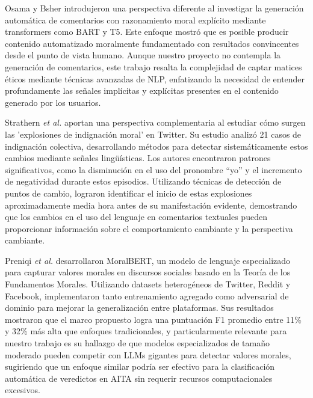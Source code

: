 Osama y Bsher \cite{osama2023} introdujeron una perspectiva diferente al investigar la generación automática de comentarios con razonamiento moral explícito mediante transformers como BART y T5. Este enfoque mostró que es posible producir contenido automatizado moralmente fundamentado con resultados convincentes desde el punto de vista humano. Aunque nuestro proyecto no contempla la generación de comentarios, este trabajo resalta la complejidad de captar matices éticos mediante técnicas avanzadas de NLP, enfatizando la necesidad de entender profundamente las señales implícitas y explícitas presentes en el contenido generado por los usuarios.

Strathern \textit{et al.} \cite{strathern2020} aportan una perspectiva complementaria al estudiar cómo surgen las 'explosiones de indignación moral' en Twitter. Su estudio analizó 21 casos de indignación colectiva, desarrollando métodos para detectar sistemáticamente estos cambios mediante señales lingüísticas. Los autores encontraron patrones significativos, como la disminución en el uso del pronombre ``yo'' y el incremento de negatividad durante estos episodios. Utilizando técnicas de detección de puntos de cambio, lograron identificar el inicio de estas explosiones aproximadamente media hora antes de su manifestación evidente, demostrando que los cambios en el uso del lenguaje en comentarios textuales pueden proporcionar información sobre el comportamiento cambiante y la perspectiva cambiante.

Preniqi \textit{et al.} \cite{preniqi2024} desarrollaron MoralBERT, un modelo de lenguaje especializado para capturar valores morales en discursos sociales basado en la Teoría de los Fundamentos Morales. Utilizando datasets heterogéneos de Twitter, Reddit y Facebook, implementaron tanto entrenamiento agregado como adversarial de dominio para mejorar la generalización entre plataformas. Sus resultados mostraron que el marco propuesto logra una puntuación F1 promedio entre 11\% y 32\% más alta que enfoques tradicionales, y particularmente relevante para nuestro trabajo es su hallazgo de que modelos especializados de tamaño moderado pueden competir con LLMs gigantes para detectar valores morales, sugiriendo que un enfoque similar podría ser efectivo para la clasificación automática de veredictos en AITA sin requerir recursos computacionales excesivos.
